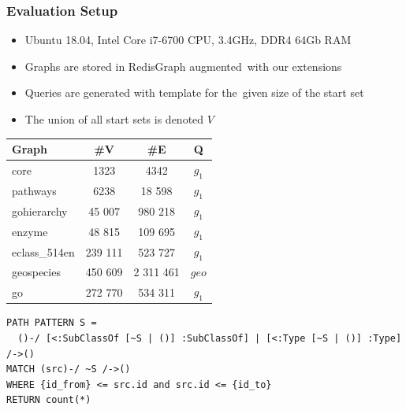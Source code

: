 \documentclass[xcolor=table,aspectratio=169]{beamer}
\begin{document}
\begin{frame}[fragile] \frametitle{Evaluation Setup}

\begin{minipage}[t]{0.51\textwidth}
\vspace{-2cm}
\begin{itemize}
  \item Ubuntu 18.04, Intel Core i7-6700 CPU, 3.4GHz, DDR4 64Gb RAM
  \item Graphs are stored in RedisGraph augmented~with our extensions
  \item Queries are generated with template for the~given size of the start set
  \item The union of all start sets is denoted $V$
\end{itemize}

\end{minipage}
\pause
\begin{minipage}[t]{0.44\textwidth}
{
\begin{tabular}{|l|c|c|c|}
\hline
Graph                  & \#V                  & \#E                  & Q     \\

\hline
\hline
core                   & 1323                 & 4342                 & $g_1$ \\
pathways               & 6238                 & 18 598               & $g_1$ \\
gohierarchy            & 45 007               & 980 218              & $g_1$ \\
enzyme                 & 48 815               & 109 695              & $g_1$ \\
eclass\_514en          & 239 111              & 523 727              & $g_1$ \\
geospecies             & 450 609              & 2 311 461            & $geo$ \\
go                     & 272 770              & 534 311              & $g_1$ \\
\hline
\end{tabular}
}

\end{minipage}

\vspace{1cm}
\pause
\begin{verbatim}
PATH PATTERN S =
  ()-/ [<:SubClassOf [~S | ()] :SubClassOf] | [<:Type [~S | ()] :Type] /->()
MATCH (src)-/ ~S /->()
WHERE {id_from} <= src.id and src.id <= {id_to}
RETURN count(*)

\end{verbatim}


\end{frame}
\end{document}
